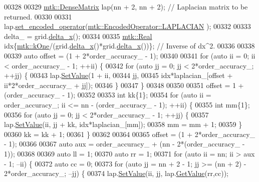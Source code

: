 \begin{DoxyCode}
00328 
00329   \hyperlink{classmtk_1_1DenseMatrix}{mtk::DenseMatrix} lap(nn + 2, nn + 2); \textcolor{comment}{// Laplacian matrix to be returned.}
00330 
00331   lap.\hyperlink{classmtk_1_1DenseMatrix_ac0f824b0fec88c4fb42e77b7550fb0d3}{set\_encoded\_operator}(\hyperlink{namespacemtk_ga9b50023bfb2692219d2915feade94f80a1c2d5f3f8e6cbb0c7b033c388c905d22}{mtk::EncodedOperator::LAPLACIAN}
      );
00332 
00333   delta\_ = grid.\hyperlink{classmtk_1_1UniStgGrid1D_a6e7173b01241632cf509496d66b9f74c}{delta\_x}();
00334 
00335   \hyperlink{group__c01-roots_gac080bbbf5cbb5502c9f00405f894857d}{mtk::Real} idx\{\hyperlink{group__c01-roots_ga26407c24d43b6b95480943340d285c71}{mtk::kOne}/(grid.\hyperlink{classmtk_1_1UniStgGrid1D_a6e7173b01241632cf509496d66b9f74c}{delta\_x}()*grid.\hyperlink{classmtk_1_1UniStgGrid1D_a6e7173b01241632cf509496d66b9f74c}{delta\_x}())\}; \textcolor{comment}{// Inverse of
       dx^2.}
00336 
00338 
00339   \textcolor{keyword}{auto} offset = (1 + 2*order\_accuracy\_ - 1);
00340 
00341   \textcolor{keywordflow}{for} (\textcolor{keyword}{auto} ii = 0; ii < order\_accuracy\_ - 1; ++ii) \{
00342     \textcolor{keywordflow}{for} (\textcolor{keyword}{auto} jj = 0; jj < 2*order\_accuracy\_; ++jj) \{
00343       lap.\hyperlink{classmtk_1_1DenseMatrix_a784ce5784109ac86bfb9d8562b334b13}{SetValue}(1 + ii,
00344                    jj,
00345                    idx*laplacian\_[offset + ii*2*order\_accuracy\_ + jj]);
00346     \}
00347   \}
00348 
00350 
00351   offset = 1 + (order\_accuracy\_ - 1);
00352 
00353   \textcolor{keywordtype}{int} kk\{1\};
00354   \textcolor{keywordflow}{for} (\textcolor{keyword}{auto} ii = order\_accuracy\_; ii <= nn - (order\_accuracy\_ - 1); ++ii) \{
00355     \textcolor{keywordtype}{int} mm\{1\};
00356     \textcolor{keywordflow}{for} (\textcolor{keyword}{auto} jj = 0; jj < 2*order\_accuracy\_ - 1; ++jj) \{
00357       lap.\hyperlink{classmtk_1_1DenseMatrix_a784ce5784109ac86bfb9d8562b334b13}{SetValue}(ii, jj + kk, idx*laplacian\_[mm]);
00358       mm = mm + 1;
00359     \}
00360     kk = kk + 1;
00361   \}
00362 
00364 
00365   offset = (1 + 2*order\_accuracy\_ - 1);
00366 
00367   \textcolor{keyword}{auto} aux = order\_accuracy\_ + (nn - 2*(order\_accuracy\_ - 1));
00368 
00369   \textcolor{keyword}{auto} ll = 1;
00370   \textcolor{keyword}{auto} rr = 1;
00371   \textcolor{keywordflow}{for} (\textcolor{keyword}{auto} ii = nn; ii > aux - 1; --ii) \{
00372     \textcolor{keyword}{auto} cc = 0;
00373     \textcolor{keywordflow}{for} (\textcolor{keyword}{auto} jj = nn + 2 - 1; jj >= (nn + 2) - 2*order\_accuracy\_; --jj) \{
00374       lap.\hyperlink{classmtk_1_1DenseMatrix_a784ce5784109ac86bfb9d8562b334b13}{SetValue}(ii, jj, lap.\hyperlink{classmtk_1_1DenseMatrix_a4b23ecbebd970b5eea915dbb50691024}{GetValue}(rr,cc));

\end{DoxyCode}

